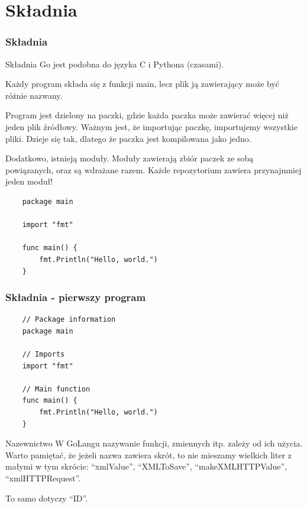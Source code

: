 \documentclass[10pt]{beamer}
\newcommand{\quotes}[1]{``#1''}
\begin{document}
\section[Składnia]{Składnia}
\begin{frame}[fragile]
    \frametitle{Składnia}
    Składnia Go jest podobna do języka C i Pythona (czasami).

    Każdy program składa się z funkcji main, lecz plik ją zawierający może być
    różnie nazwany.

    Program jest dzielony na paczki, gdzie każda paczka może zawierać więcej
    niż jeden plik źródłowy. Ważnym jest, że importując paczkę, importujemy wszystkie
    pliki. Dzieje się tak, dlatego że paczka jest kompilowana jako jedno.

    Dodatkowo, istnieją moduły. Moduły zawierają zbiór paczek ze sobą powiązanych,
    oraz są wdrażane razem. Każde repozytorium zawiera przynajmniej jeden moduł!

    \begin{verbatim}
    package main

    import "fmt"

    func main() {
        fmt.Println("Hello, world.")
    }
    \end{verbatim}
\end{frame}

\begin{frame}[fragile]
    \frametitle{Składnia - pierwszy program}
    \begin{verbatim}
    // Package information
    package main
    
    // Imports
    import "fmt"

    // Main function
    func main() {
        fmt.Println("Hello, world.")
    }
    \end{verbatim}

    \begin{block}{Nazewnictwo}
        W GoLangu nazywanie funkcji, zmiennych itp. zależy od ich użycia.
        Warto pamiętać, że jeżeli nazwa zawiera skrót, to nie mieszamy wielkich liter
        z małymi w tym skrócie: \quotes{xmlValue}, \quotes{XMLToSave}, \quotes{makeXMLHTTPValue},
        \quotes{xmlHTTPRequest}.

        To samo dotyczy \quotes{ID}.
    \end{block}
\end{frame}
\end{document}
